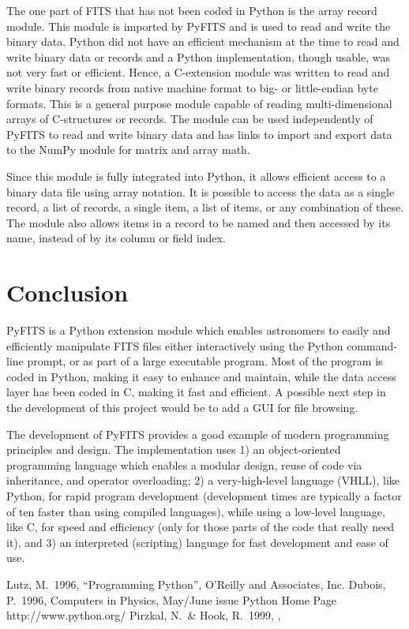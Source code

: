 The one part of FITS that has not been coded in Python is the array
record module.  This module is imported by PyFITS and is used to read
and write the binary data.  Python did not have an efficient mechanism
at the time to read and write binary data or records and a Python
implementation, though usable, was not very fast or efficient.  Hence,
a C-extension module was written to read and write binary records from
native machine format to big- or little-endian byte formats.  This is
a general purpose module capable of reading multi-dimensional arrays of
C-structures or records.  The module can be used independently of
PyFITS to read and write binary data and has links to import and
export data to the NumPy module for matrix and array math.

Since this module is fully integrated into Python, it allows efficient
access to a binary data file using array notation.  It is possible to
access the data as a single record, a list of records, a single item, a
list of items, or any combination of these.  The module also allows
items in a record to be named and then accessed by its name, instead
of by its column or field index.

\section{Conclusion}

PyFITS is a Python extension module which enables astronomers to 
easily and efficiently manipulate FITS files either interactively 
using the Python command-line prompt, or as part of a large executable 
program.  Most of the program is coded in Python, making it easy to 
enhance and maintain, while the data access layer has been coded in 
C, making it fast and efficient.  A possible next step in the 
development of this project would be to add a GUI for file browsing.

The development of PyFITS provides a good example of modern 
programming principles and design.  The implementation uses 1) an 
object-oriented programming language which enables a modular design, 
reuse of code via inheritance, and operator overloading; 2) a 
very-high-level language (VHLL), like Python, for rapid program 
development (development times are typically a factor of ten faster 
than using compiled languages), while using a low-level language, 
like C, for speed and efficiency (only for those parts of the code 
that really need it), and 3) an interpreted (scripting) language for 
fast development and ease of use.

\begin{references}
 Lutz, M.\ 1996, ``Programming Python'', O'Reilly and Associates, Inc.
 Dubois, P.\ 1996, Computers in Physics, May/June issue
 Python Home Page http://www.python.org/
 Pirzkal, N.\ \& Hook, R.\ 1999, \adassviii, 
\end{references}



